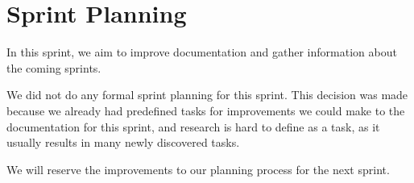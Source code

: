 \section{Sprint Planning}
In this sprint, we aim to improve documentation and gather information about the coming sprints.

We did not do any formal sprint planning for this sprint. This decision was made because we already had predefined tasks for improvements we could make to the documentation for this sprint, and research is hard to define as a task, as it usually results in many newly discovered tasks.

We will reserve the improvements to our planning process for the next sprint.

